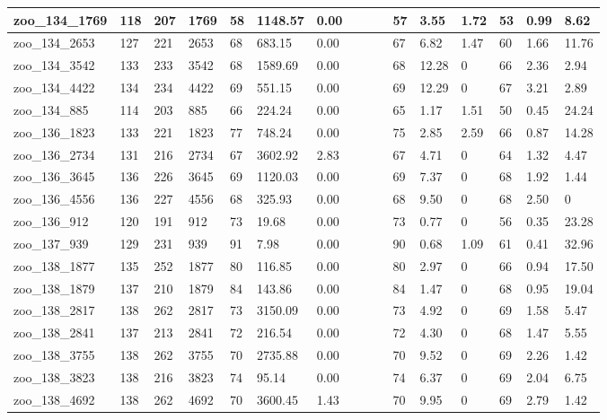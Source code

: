 \begin{landscape}
\begin{longtable}{llllllllllllllll}
zoo\_134\_1769 & 118 & 207 & 1769 & 58 & 1148.57 & 0.00 &  &  &  & 57 & 3.55 & 1.72 & 53 & 0.99 & 8.62 \\ \hline 
zoo\_134\_2653 & 127 & 221 & 2653 & 68 & 683.15 & 0.00 &  &  &  & 67 & 6.82 & 1.47 & 60 & 1.66 & 11.76 \\ \hline 
zoo\_134\_3542 & 133 & 233 & 3542 & 68 & 1589.69 & 0.00 &  &  &  & 68 & 12.28 & 0 & 66 & 2.36 & 2.94 \\ \hline 
zoo\_134\_4422 & 134 & 234 & 4422 & 69 & 551.15 & 0.00 &  &  &  & 69 & 12.29 & 0 & 67 & 3.21 & 2.89 \\ \hline 
zoo\_134\_885 & 114 & 203 & 885 & 66 & 224.24 & 0.00 &  &  &  & 65 & 1.17 & 1.51 & 50 & 0.45 & 24.24 \\ \hline 
zoo\_136\_1823 & 133 & 221 & 1823 & 77 & 748.24 & 0.00 &  &  &  & 75 & 2.85 & 2.59 & 66 & 0.87 & 14.28 \\ \hline 
zoo\_136\_2734 & 131 & 216 & 2734 & 67 & 3602.92 & 2.83 &  &  &  & 67 & 4.71 & 0 & 64 & 1.32 & 4.47 \\ \hline 
zoo\_136\_3645 & 136 & 226 & 3645 & 69 & 1120.03 & 0.00 &  &  &  & 69 & 7.37 & 0 & 68 & 1.92 & 1.44 \\ \hline 
zoo\_136\_4556 & 136 & 227 & 4556 & 68 & 325.93 & 0.00 &  &  &  & 68 & 9.50 & 0 & 68 & 2.50 & 0 \\ \hline 
zoo\_136\_912 & 120 & 191 & 912 & 73 & 19.68 & 0.00 &  &  &  & 73 & 0.77 & 0 & 56 & 0.35 & 23.28 \\ \hline 
zoo\_137\_939 & 129 & 231 & 939 & 91 & 7.98 & 0.00 &  &  &  & 90 & 0.68 & 1.09 & 61 & 0.41 & 32.96 \\ \hline 
zoo\_138\_1877 & 135 & 252 & 1877 & 80 & 116.85 & 0.00 &  &  &  & 80 & 2.97 & 0 & 66 & 0.94 & 17.50 \\ \hline 
zoo\_138\_1879 & 137 & 210 & 1879 & 84 & 143.86 & 0.00 &  &  &  & 84 & 1.47 & 0 & 68 & 0.95 & 19.04 \\ \hline 
zoo\_138\_2817 & 138 & 262 & 2817 & 73 & 3150.09 & 0.00 &  &  &  & 73 & 4.92 & 0 & 69 & 1.58 & 5.47 \\ \hline 
zoo\_138\_2841 & 137 & 213 & 2841 & 72 & 216.54 & 0.00 &  &  &  & 72 & 4.30 & 0 & 68 & 1.47 & 5.55 \\ \hline 
zoo\_138\_3755 & 138 & 262 & 3755 & 70 & 2735.88 & 0.00 &  &  &  & 70 & 9.52 & 0 & 69 & 2.26 & 1.42 \\ \hline 
zoo\_138\_3823 & 138 & 216 & 3823 & 74 & 95.14 & 0.00 &  &  &  & 74 & 6.37 & 0 & 69 & 2.04 & 6.75 \\ \hline 
zoo\_138\_4692 & 138 & 262 & 4692 & 70 & 3600.45 & 1.43 &  &  &  & 70 & 9.95 & 0 & 69 & 2.79 & 1.42 \\ \hline 

\end{longtable}
\end{landscape}
